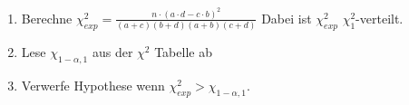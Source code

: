 \documentclass[a4paper, 11pt]{article}
\begin{document}
\begin{enumerate}
  \item Berechne $\chi_{exp}^2= \frac{n\cdot (a\cdot d - c\cdot
  b)^2}{(a+c)(b+d)(a+b)(c+d)}$ Dabei ist $\chi_{exp}^2$ $\chi_1^2$-verteilt.
  \item Lese $\chi_{1-\alpha, 1}$ aus der $\chi^2$ Tabelle ab
  \item Verwerfe Hypothese wenn $\chi_{exp}^2 > \chi_{1-\alpha, 1}$.
\end{enumerate}
\end{document}
